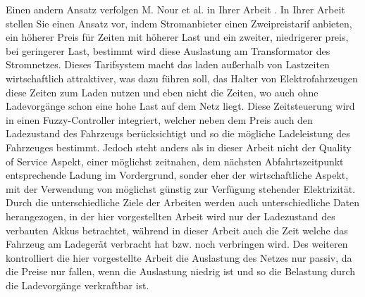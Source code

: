 Einen andern Ansatz verfolgen M. Nour et al. in Ihrer Arbeit \cite{RW_2_1}. In Ihrer Arbeit stellen Sie einen Ansatz vor, indem Stromanbieter einen Zweipreistarif anbieten, ein höherer Preis für Zeiten mit höherer Last und ein zweiter, niedrigerer preis, bei geringerer Last, bestimmt wird diese Auslastung am Transformator des Stromnetzes. Dieses Tarifsystem macht das laden außerhalb von Lastzeiten wirtschaftlich attraktiver, was dazu führen soll, das Halter von Elektrofahrzeugen diese Zeiten zum Laden nutzen und eben nicht die Zeiten, wo auch ohne Ladevorgänge schon eine hohe Last auf dem Netz liegt. Diese Zeitsteuerung wird in einen Fuzzy-Controller integriert, welcher neben dem Preis auch den Ladezustand des Fahrzeugs berücksichtigt und so die mögliche Ladeleistung des Fahrzeuges bestimmt. Jedoch steht anders als in dieser Arbeit nicht der Quality of Service Aspekt, einer möglichst zeitnahen,  dem nächsten Abfahrtszeitpunkt entsprechende Ladung im Vordergrund, sonder eher der wirtschaftliche Aspekt, mit der Verwendung von möglichst günstig zur Verfügung stehender Elektrizität. Durch die unterschiedliche Ziele der Arbeiten werden auch unterschiedliche Daten herangezogen, in der hier vorgestellten Arbeit wird nur der Ladezustand des verbauten Akkus betrachtet, während in dieser Arbeit auch die Zeit welche das Fahrzeug am Ladegerät verbracht hat bzw. noch verbringen wird. Des weiteren kontrolliert die hier vorgestellte Arbeit die Auslastung des Netzes nur passiv, da die Preise nur fallen, wenn die Auslastung niedrig ist und so die Belastung durch die Ladevorgänge verkraftbar ist.

